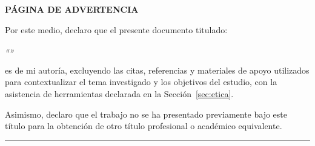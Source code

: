 \thispagestyle{plain}
\vspace*{0.6cm}

\begin{center}
  {\Large\bfseries PÁGINA DE ADVERTENCIA\par}
\end{center}

\vspace{0.6cm}

\begin{center}
  \begin{minipage}{0.85\textwidth}
    \setlength{\parskip}{0.9\baselineskip}
    \justifying
    Por este medio, declaro que el presente documento titulado:

    \begin{center}
      \emph{«\Titulo»}
    \end{center}

    es de mi autoría, excluyendo las citas, referencias y materiales de apoyo utilizados para contextualizar el tema investigado y los objetivos del estudio, con la asistencia de herramientas declarada en la Sección~\ref{sec:etica}.

    Asimismo, declaro que el trabajo no se ha presentado previamente bajo este título para la obtención de otro título profesional o académico equivalente.
  \end{minipage}
\end{center}

\vspace*{0.6cm}

\begin{center}
  \rule{8cm}{0.5pt}\\[0.6\baselineskip]
  \Autor
\end{center}

\vfill
\clearpage
